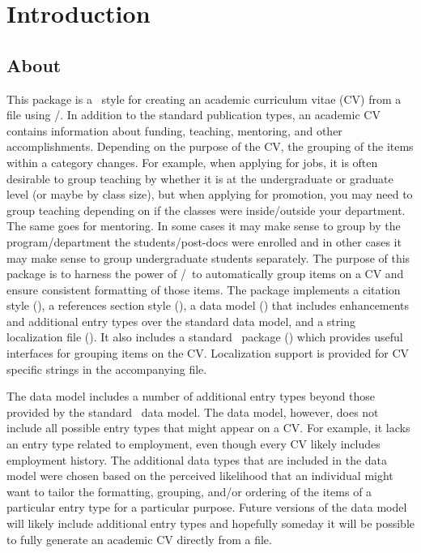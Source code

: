 \documentclass{ltxdockit}[2011/03/25]
\newcommand*{\biber}{\sty{biber}\xspace}
\newcommand*{\biblatex}{\sty{biblatex}\xspace}
\begin{document}
\nocite{*}
\printtitlepage
\tableofcontents

\section{Introduction}
\subsection{About}
This package is a \biblatex\ style for creating an academic curriculum vitae (CV) from a \bibtex\  file using \biber\slash\biblatex. In addition to the standard publication types, an academic CV contains information about funding, teaching, mentoring, and other accomplishments. Depending on the purpose of the CV, the grouping of the items within a category changes. For example, when applying for jobs, it is often desirable to group teaching by whether it is at the undergraduate or graduate level (or maybe by class size), but when applying for promotion, you may need to group teaching depending on if the classes were inside/outside your department. The same goes for mentoring. In some cases it may make sense to group by the program/department the students/post-docs were enrolled and in other cases it may make sense to group undergraduate students separately. The purpose of this package is to harness the power of \biber\slash\biblatex\ to automatically group items on a CV and ensure consistent formatting of those items. The package implements a citation style (), a references section style (), a data model () that includes enhancements and additional entry types over the standard data model, and a string localization file (). It also includes a standard \latex\ package () which provides useful interfaces for grouping items on the CV. Localization support is provided for CV specific strings in the accompanying  file.

The  data model includes a number of additional entry types beyond those provided by the standard \biblatex\ data model. The  data model, however, does not include all possible entry types that might appear on a CV. For example, it lacks an entry type related to employment, even though every CV likely includes employment history. The additional data types that are included in the  data model were chosen based on the perceived likelihood that an individual might want to tailor the formatting, grouping, and/or ordering of the items of a particular entry type for a particular purpose. Future versions of the  data model will likely include additional entry types and hopefully someday it will be possible to fully generate an academic CV directly from a  file.
\end{document}
